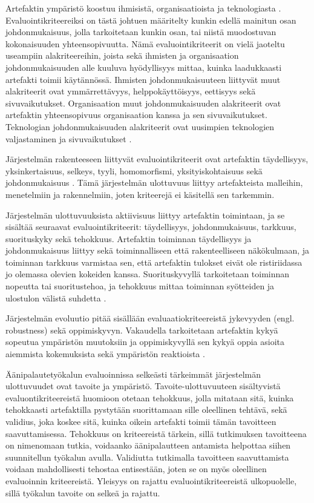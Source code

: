 \documentclass[utf8]{gradu3}
\begin{document}
Artefaktin ympäristö koostuu ihmisistä, organisaatioista ja teknologiasta \parencite[][]{hevner2004}. Evaluointikriteereiksi on tästä johtuen määritelty kunkin edellä mainitun osan johdonmukaisuus, jolla tarkoitetaan kunkin osan, tai niistä muodostuvan kokonaisuuden yhteensopivuutta. Nämä evaluointikriteerit on vielä jaoteltu useampiin alakriteereihin, joista sekä ihmisten ja organisaation johdonmukaisuuden alle kuuluva hyödyllisyys mittaa, kuinka laadukkaasti artefakti toimii käytännössä. Ihmisten johdonmukaisuuteen liittyvät muut alakriteerit ovat ymmärrettävyys, helppokäyttöisyys, eettisyys sekä sivuvaikutukset. Organisaation muut johdonmukaisuuden alakriteerit ovat artefaktin yhteensopivuus organisaation kanssa ja sen sivuvaikutukset. Teknologian johdonmukaisuuden alakriteerit ovat uusimpien teknologien valjastaminen ja sivuvaikutukset \parencite[][]{evaluation}.

Järjestelmän rakenteeseen liittyvät evaluointikriteerit ovat artefaktin täydellisyys, yksinkertaisuus, selkeys, tyyli, homomorfismi, yksityiskohtaisuus sekä johdonmukaisuus \parencite[][]{evaluation}. Tämä järjestelmän ulottuvuus liittyy artefakteista malleihin, menetelmiin ja rakennelmiin, joten kriteerejä ei käsitellä sen tarkemmin.

Järjestelmän ulottuvuuksista aktiivisuus liittyy artefaktin toimintaan, ja se sisältää seuraavat evaluointikriteerit: täydellisyys,  johdonmukaisuus, tarkkuus, suorituskyky sekä tehokkuus. Artefaktin toiminnan täydellisyys ja johdonmukaisuus liittyy sekä toiminnalliseen että rakenteelliseen näkökulmaan, ja toiminnan tarkkuus varmistaa sen, että artefaktin tulokset eivät ole ristiriidassa jo olemassa olevien kokeiden kanssa. Suorituskyvyllä tarkoitetaan toiminnan nopeutta tai suoritustehoa, ja tehokkuus mittaa toiminnan syötteiden ja ulostulon välistä suhdetta \parencite[][]{evaluation}.

Järjestelmän evoluutio pitää sisällään evaluaatiokriteereistä jykevyyden (engl. robustness) sekä oppimiskyvyn. Vakaudella tarkoitetaan artefaktin kykyä sopeutua ympäristön muutoksiin ja oppimiskyvyllä sen kykyä oppia asioita aiemmista kokemuksista sekä ympäristön reaktioista \parencite[][]{evaluation}.

Äänipalautetyökalun evaluoinnissa selkeästi tärkeimmät järjestelmän ulottuvuudet ovat tavoite ja ympäristö. Tavoite-ulottuvuuteen sisältyvistä evaluontikriteereistä huomioon otetaan tehokkuus, jolla mitataan sitä, kuinka tehokkaasti artefaktilla pystytään suorittamaan sille oleellinen tehtävä, sekä validius, joka koskee sitä, kuinka oikein artefakti toimii tämän tavoitteen saavuttamisessa. Tehokkuus on kriteereistä tärkein, sillä tutkimuksen tavoitteena on nimenomaan tutkia, voidaanko äänipalautteen antamista helpottaa siihen suunnitellun työkalun avulla. Validiutta tutkimalla tavoitteen saavuttamista voidaan mahdollisesti tehostaa entisestään, joten se on myös oleellinen evaluoinnin kriteereistä. Yleisyys on rajattu evaluointikriteereistä ulkopuolelle, sillä työkalun tavoite on selkeä ja rajattu.
\end{document}

